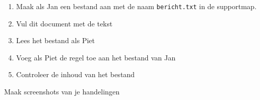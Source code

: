 \begin{enumerate}
\item Maak als Jan een bestand aan met de naam \texttt{bericht.txt} in de supportmap.
\item Vul dit document met de tekst 
\item Lees het bestand als Piet
\item Voeg als Piet de regel  toe aan het bestand van Jan
\item Controleer de inhoud van het bestand
\end{enumerate}

Maak screenshots van je handelingen
